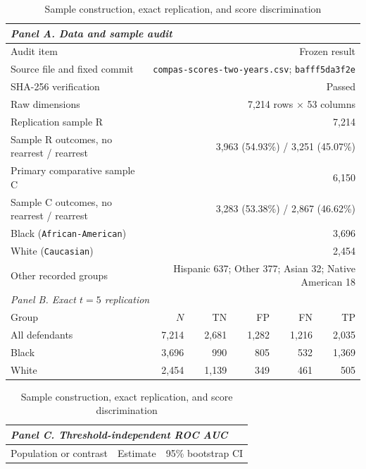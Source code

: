 \documentclass[11pt,letterpaper]{article}
\begin{document}
\FloatBarrier

\begin{table}[p]
\centering
\caption{Sample construction, exact replication, and score discrimination}
\label{tab:sample-replication}
\small
\begin{threeparttable}
\begin{tabular*}{\textwidth}{@{\extracolsep{\fill}}lrrrrr@{}}
\toprule
\multicolumn{6}{l}{\textit{Panel A. Data and sample audit}} \\
\midrule
Audit item & \multicolumn{5}{r}{Frozen result} \\
Source file and fixed commit & \multicolumn{5}{r}{\texttt{compas-scores-two-years.csv}; \texttt{bafff5da3f2e}} \\
SHA-256 verification & \multicolumn{5}{r}{Passed} \\
Raw dimensions & \multicolumn{5}{r}{7,214 rows $\times$ 53 columns} \\
Replication sample R & \multicolumn{5}{r}{7,214} \\
Sample R outcomes, no rearrest / rearrest & \multicolumn{5}{r}{3,963 (54.93\%) / 3,251 (45.07\%)} \\
Primary comparative sample C & \multicolumn{5}{r}{6,150} \\
Sample C outcomes, no rearrest / rearrest & \multicolumn{5}{r}{3,283 (53.38\%) / 2,867 (46.62\%)} \\
Black (\texttt{African-American}) & \multicolumn{5}{r}{3,696} \\
White (\texttt{Caucasian}) & \multicolumn{5}{r}{2,454} \\
Other recorded groups & \multicolumn{5}{r}{Hispanic 637; Other 377; Asian 32; Native American 18} \\
\midrule
\multicolumn{6}{l}{\textit{Panel B. Exact $t=5$ replication}} \\
\midrule
Group & $N$ & TN & FP & FN & TP \\
All defendants & 7,214 & 2,681 & 1,282 & 1,216 & 2,035 \\
Black & 3,696 & 990 & 805 & 532 & 1,369 \\
White & 2,454 & 1,139 & 349 & 461 & 505 \\
\bottomrule
\end{tabular*}
\vspace{2pt}
\begin{tabular*}{\textwidth}{@{\extracolsep{\fill}}lrr@{}}
\toprule
\multicolumn{3}{l}{\textit{Panel C. Threshold-independent ROC AUC}} \\
\midrule
Population or contrast & Estimate & 95\% bootstrap CI \\

\end{tabular*}
\end{threeparttable}
\end{table}
\end{document}
